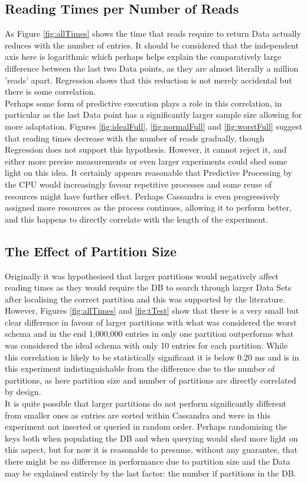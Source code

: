 \documentclass{template/csfourzero}
\begin{document}
  \subsection{Reading Times per Number of Reads}
  As Figure \ref{fig:allTimes} shows the time that reads require to return Data actually reduces with the number of entries. It should be considered that the independent axis here is logarithmic which perhaps helps explain the comparatively large difference between the last two Data points, as they are almost literally a million 'reads' apart. Regression shows that this reduction is not merely accidental but there is some correlation. 
  \\
  Perhaps some form of predictive execution plays a role in this correlation, in particular as the last Data point has a significantly larger sample size allowing for more adaptation. Figures \ref{fig:idealFull}, \ref{fig:normalFull} and \ref{fig:worstFull} suggest that reading times decrease with the number of reads gradually, though Regression does not support this hypothesis. However, it cannot reject it, and either more precise measurements or even larger experiments could shed some light on this idea. It certainly appears reasonable that Predictive Processing by the CPU would increasingly favour repetitive processes and some reuse of resources might have further effect. Perhaps Cassandra is even progressively assigned more resources as the process continues, allowing it to perform better, and this happens to directly correlate with the length of the experiment.
  
  \subsection{The Effect of Partition Size}
  Originally it was hypothesised that larger partitions would negatively affect reading times as they would require the DB to search through larger Data Sets after localising the correct partition and this was supported by the literature. \cite{ctoAnalysis} However, Figures \ref{fig:allTimes} and \ref{fig:tTest} show that there is a very small but clear difference in favour of larger partitions with what was considered the worst schema and in the end 1,000,000 entries in only one partition outperforms what was considered the ideal schema with only 10 entries for each partition. While this correlation is likely to be statistically significant it is below 0.20 ms and is in this experiment indistinguishable from the difference due to the number of partitions, as here partition size and number of partitions are directly correlated by design. 
  \\
  It is quite possible that larger partitions do not perform significantly different from smaller ones as entries are sorted within Cassandra and were in this experiment not inserted or queried in random order. Perhaps randomising the keys both when populating the DB and when querying would shed more light on this aspect, but for now it is reasonable to presume, without any guarantee, that there might be no difference in performance due to partition size and the Data may be explained entirely by the last factor: the number if partitions in the DB. 
  
\end{document}
